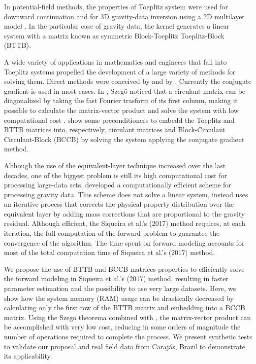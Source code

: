 \documentclass[paper]{geophysics}
\begin{document}
In potential-field methods, the properties of Toeplitz system were used for downward continuation \cite[]{zhang2016bttb} and for 3D gravity-data inversion using a 2D multilayer model \cite[]{zhang2015bttb}. In the particular case of gravity data, the kernel generates a linear system with a matrix known as symmetric Block-Toeplitz Toeplitz-Block (BTTB).

A wide variety of applications in mathematics and engineers that fall into Toeplitz systems propelled the development of a large variety of  methods for solving them. Direct methods were conceived by \cite{levinson1946wiener} and by \cite{trench1964algorithm}. Currently the conjugate gradient is used in most cases. In \cite{grenander1984szeg}, Szeg\"{o} noticed that a circulant matrix can be diagonalized by taking the fast Fourier trasform of its first column, making it possible to calculate the matrix-vector product and solve the system with low computational cost \cite[]{strang1986introduction,olkin1986linear}. \cite{chan2007introduction} show some preconditioners to embedd the Toeplitz and BTTB matrices into, respectively, circulant matrices and Block-Circulant Circulant-Block (BCCB) by solving the system applying the conjugate gradient method.

Although the use of the equivalent-layer technique increased over the last decades, one of the biggest problem is still its high computational cost for processing large-data sets. \cite{siqueira2017fast} developed a computationally efficient scheme for processing gravity data. This scheme does not solve a linear system, instead uses an iterative process that corrects the physical-property distribution over the equivalent layer by adding mass corrections that are proportional to the gravity residual. Although efficient, the Siqueira et al.'s (2017) method requires, at each iteration,  the full computation of the forward problem to guarantee the convergence of the algorithm. The time spent on forward modeling accounts for most of the total computation time of Siqueira et al.'s (2017) method.

We propose the use of BTTB and BCCB matrices properties to efficiently  solve the forward modeling in Siqueira et al.'s (2017) method, resulting in faster parameter estimation and the possibility to use very large datasets. Here, we show how the system memory (RAM) usage can be drastically decreased by calculating only the first row of the BTTB matrix and embedding into a BCCB matrix. Using the Szeg\"{o} theorema  combined with \cite{strang1986introduction}, the matrix-vector product can be accomplished with very low cost, reducing in some orders of magnitude the number of operations required to complete the process. We present synthetic tests to validate our proposal and real field data from Caraj\'as, Brazil to demonstrate its applicability.
\end{document}
